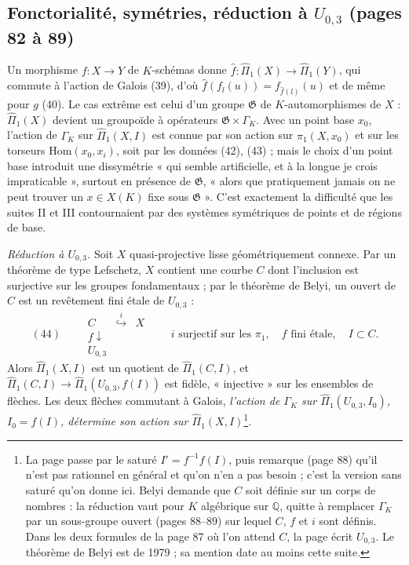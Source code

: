 \documentclass[11pt,a4paper]{article}
\begin{document}
\subsection*{Fonctorialité, symétries, réduction à $U_{0,3}$ (pages 82 à 89)}

Un morphisme $f : X \to Y$ de $K$-schémas donne $\widehat f :
\widehat\Pi_1(X) \to \widehat\Pi_1(Y)$, qui commute à l'action de Galois (39),
d'où $\widehat f(f_l(u)) = f_{\widehat f(l)}(u)$ et de même pour $g$ (40). Le
cas extrême est celui d'un groupe $\mathfrak{G}$ de $K$-automorphismes de $X$ :
$\widehat\Pi_1(X)$ devient un groupoïde à opérateurs $\mathfrak{G} \times
\Gamma_K$. Avec un point base $x_0$, l'action de $\Gamma_K$ sur
$\widehat\Pi_1(X, I)$ est connue par son action sur $\widehat\pi_1(X, x_0)$ et
sur les torseurs $\mathrm{Hom}(x_0, x_i)$, soit par les données (42), (43) ;
mais le choix d'un point base introduit une dissymétrie « qui semble
artificielle, et à la longue je crois impraticable », surtout en présence de
$\mathfrak{G}$, « alors que pratiquement jamais on ne peut trouver un
$x \in X(K)$ fixe sous $\mathfrak{G}$ ». C'est exactement la difficulté que
les suites II et III contournaient par des systèmes symétriques de points et
de régions de base.

\emph{Réduction à $U_{0,3}$.} Soit $X$ quasi-projective lisse
géométriquement connexe. Par un théorème de type Lefschetz, $X$ contient une
courbe $C$ dont l'inclusion est surjective sur les groupes fondamentaux ; par
le théorème de Belyi, un ouvert de $C$ est un revêtement fini étale de
$U_{0,3}$ :
\[
(44)\qquad
\begin{array}{ccc}
C & \overset{i}{\hookrightarrow} & X\\
{\scriptstyle f}\downarrow & & \\
U_{0,3} & &
\end{array}
\qquad i \text{ surjectif sur les } \pi_1,\quad f \text{ fini étale},\quad I \subset C .
\]
Alors $\widehat\Pi_1(X, I)$ est un quotient de $\widehat\Pi_1(C, I)$, et
$\widehat\Pi_1(C, I) \to \widehat\Pi_1(U_{0,3}, f(I))$ est fidèle,
« injective » sur les ensembles de flèches. Les deux flèches commutant à
Galois, \emph{l'action de $\Gamma_K$ sur $\widehat\Pi_1(U_{0,3}, I_0)$, $I_0 =
f(I)$, détermine son action sur $\widehat\Pi_1(X, I)$}\footnote{La page passe
par le saturé $I' = f^{-1}f(I)$, puis remarque (page 88) qu'il n'est pas
rationnel en général et qu'on n'en a pas besoin ; c'est la version sans
saturé qu'on donne ici. Belyi demande que $C$ soit définie sur un corps de
nombres : la réduction vaut pour $K$ algébrique sur $\mathbb{Q}$, quitte à
remplacer $\Gamma_K$ par un sous-groupe ouvert (pages 88–89) sur lequel $C$,
$f$ et $i$ sont définis. Dans les deux formules de la page 87 où l'on attend
$C$, la page écrit $U_{0,3}$. Le théorème de Belyi est de 1979 ; sa mention
date au moins cette suite.}.
\end{document}
